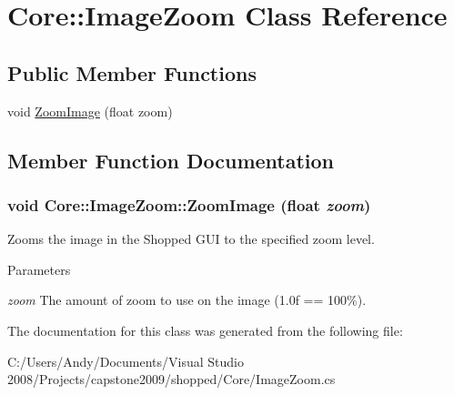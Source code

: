 \hypertarget{class_core_1_1_image_zoom}{
\section{Core::ImageZoom Class Reference}
\label{class_core_1_1_image_zoom}
}
\subsection*{Public Member Functions}
\begin{DoxyCompactItemize}
\item 
void \hyperlink{class_core_1_1_image_zoom_a656d435ebf586dcec94dc46be1f46834}{ZoomImage} (float zoom)
\end{DoxyCompactItemize}


\subsection{Member Function Documentation}
\hypertarget{class_core_1_1_image_zoom_a656d435ebf586dcec94dc46be1f46834}{
\subsubsection[{ZoomImage}]{\setlength{\rightskip}{0pt plus 5cm}void Core::ImageZoom::ZoomImage (float {\em zoom})}}
\label{class_core_1_1_image_zoom_a656d435ebf586dcec94dc46be1f46834}
Zooms the image in the Shopped GUI to the specified zoom level. 
\begin{DoxyParams}{Parameters}
\item[{\em zoom}]The amount of zoom to use on the image (1.0f == 100\%). \end{DoxyParams}


The documentation for this class was generated from the following file:\begin{DoxyCompactItemize}
\item 
C:/Users/Andy/Documents/Visual Studio 2008/Projects/capstone2009/shopped/Core/ImageZoom.cs\end{DoxyCompactItemize}
